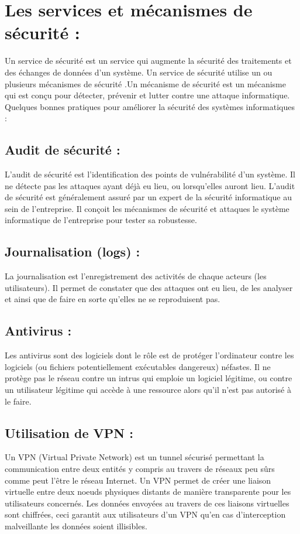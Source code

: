 \section{Les services et mécanismes de sécurité : } 
Un service de sécurité est un service qui augmente la sécurité des traitements et des échanges de données d’un système. Un service de sécurité utilise un ou plusieurs mécanismes de sécurité \cite{ref15} .Un mécanisme de sécurité est un mécanisme qui est conçu pour détecter, prévenir et lutter contre une attaque informatique.\\
Quelques bonnes pratiques pour améliorer la sécurité des systèmes informatiques :
\subsection{Audit de sécurité :}
L’audit de sécurité est l’identification des points de vulnérabilité d’un système. Il ne détecte pas les attaques ayant déjà eu lieu, ou lorsqu'elles auront lieu. L’audit de sécurité est généralement assuré par un expert de la sécurité informatique au sein de l’entreprise. Il conçoit les mécanismes de sécurité et attaques le système informatique de l’entreprise pour tester sa robustesse.
\subsection{Journalisation (logs) :}
La journalisation est l’enregistrement des activités de chaque acteurs (les utilisateurs). Il permet de constater que des attaques ont eu lieu, de les analyser et ainsi que de faire en sorte qu'elles ne se reproduisent pas.
\subsection{Antivirus :}
Les antivirus sont des logiciels dont le rôle est de protéger l’ordinateur contre les logiciels (ou fichiers potentiellement exécutables dangereux) néfastes. Il ne protège pas le réseau contre un intrus qui emploie un logiciel légitime, ou contre un utilisateur légitime qui accède à une ressource alors qu'il n'est pas autorisé à le faire.
\subsection{Utilisation de VPN :}
Un VPN (Virtual Private Network) est un tunnel sécurisé permettant la communication entre deux entités y compris au travers de réseaux peu sûrs comme peut l’être le réseau Internet. Un VPN permet de créer une liaison virtuelle entre deux noeuds physiques distants de manière transparente pour les utilisateurs concernés. Les données envoyées au travers de ces liaisons virtuelles sont chiffrées, ceci garantit aux utilisateurs d’un VPN qu’en cas d’interception malveillante les données soient illisibles.
